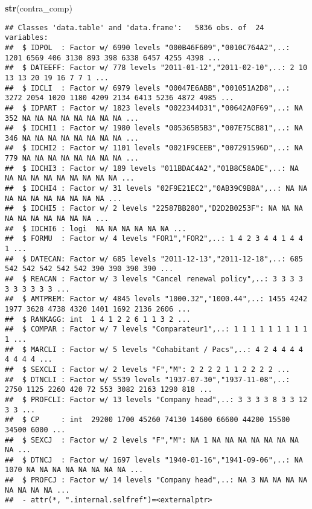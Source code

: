 \documentclass[
]{article}
\newenvironment{Shaded}{\begin{snugshade}}{\end{snugshade}}
\newcommand{\KeywordTok}[1]{\textcolor[rgb]{0.13,0.29,0.53}{\textbf{#1}}}
\newcommand{\NormalTok}[1]{#1}
\begin{document}
\begin{Shaded}
\begin{Highlighting}[]
\KeywordTok{str}\NormalTok{(contra_comp)}
\end{Highlighting}
\end{Shaded}

\begin{verbatim}
## Classes 'data.table' and 'data.frame':   5836 obs. of  24 variables:
##  $ IDPOL  : Factor w/ 6990 levels "000B46F609","0010C764A2",..: 1201 6569 406 3130 893 398 6338 6457 4255 4398 ...
##  $ DATEEFF: Factor w/ 778 levels "2011-01-12","2011-02-10",..: 2 10 13 13 20 19 16 7 7 1 ...
##  $ IDCLI  : Factor w/ 6979 levels "00047E6ABB","001051A2D8",..: 3272 2054 1020 1180 4209 2134 6413 5236 4872 4985 ...
##  $ IDPART : Factor w/ 1823 levels "0022344D31","00642A0F69",..: NA 352 NA NA NA NA NA NA NA NA ...
##  $ IDCHI1 : Factor w/ 1980 levels "005365B5B3","007E75CB81",..: NA 346 NA NA NA NA NA NA NA NA ...
##  $ IDCHI2 : Factor w/ 1101 levels "0021F9CEEB","007291596D",..: NA 779 NA NA NA NA NA NA NA NA ...
##  $ IDCHI3 : Factor w/ 189 levels "011BDAC4A2","01B8C58ADE",..: NA NA NA NA NA NA NA NA NA NA ...
##  $ IDCHI4 : Factor w/ 31 levels "02F9E21EC2","0AB39C9B8A",..: NA NA NA NA NA NA NA NA NA NA ...
##  $ IDCHI5 : Factor w/ 2 levels "22587BB280","D2D2B0253F": NA NA NA NA NA NA NA NA NA NA ...
##  $ IDCHI6 : logi  NA NA NA NA NA NA ...
##  $ FORMU  : Factor w/ 4 levels "FOR1","FOR2",..: 1 4 2 3 4 4 1 4 4 1 ...
##  $ DATECAN: Factor w/ 685 levels "2011-12-13","2011-12-18",..: 685 542 542 542 542 542 390 390 390 390 ...
##  $ REACAN : Factor w/ 3 levels "Cancel renewal policy",..: 3 3 3 3 3 3 3 3 3 3 ...
##  $ AMTPREM: Factor w/ 4845 levels "1000.32","1000.44",..: 1455 4242 1977 3628 4738 4320 1401 1692 2136 2606 ...
##  $ RANKAGG: int  1 4 1 2 2 6 1 1 3 2 ...
##  $ COMPAR : Factor w/ 7 levels "Comparateur1",..: 1 1 1 1 1 1 1 1 1 1 ...
##  $ MARCLI : Factor w/ 5 levels "Cohabitant / Pacs",..: 4 2 4 4 4 4 4 4 4 4 ...
##  $ SEXCLI : Factor w/ 2 levels "F","M": 2 2 2 2 1 1 2 2 2 2 ...
##  $ DTNCLI : Factor w/ 5539 levels "1937-07-30","1937-11-08",..: 2750 1125 2260 420 72 553 3082 2163 1290 818 ...
##  $ PROFCLI: Factor w/ 13 levels "Company head",..: 3 3 3 3 8 3 3 12 3 3 ...
##  $ CP     : int  29200 1700 45260 74130 14600 66600 44200 15500 34500 6000 ...
##  $ SEXCJ  : Factor w/ 2 levels "F","M": NA 1 NA NA NA NA NA NA NA NA ...
##  $ DTNCJ  : Factor w/ 1697 levels "1940-01-16","1941-09-06",..: NA 1070 NA NA NA NA NA NA NA NA ...
##  $ PROFCJ : Factor w/ 14 levels "Company head",..: NA 3 NA NA NA NA NA NA NA NA ...
##  - attr(*, ".internal.selfref")=<externalptr>
\end{verbatim}
\end{document}
